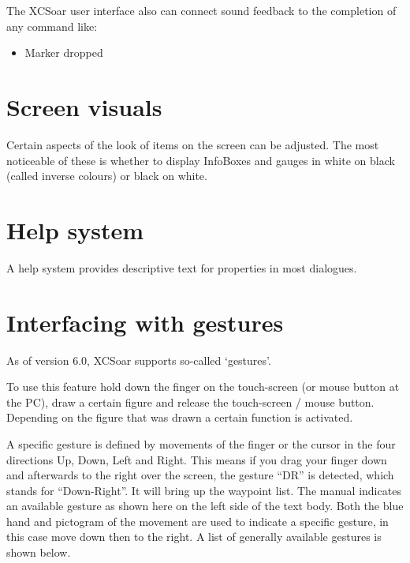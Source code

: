 The XCSoar user interface also can connect sound feedback to the completion 
of any command like:
\begin{itemize}
\item Marker dropped
\end{itemize}


\section{Screen visuals}

Certain aspects of the look of items on the screen can be adjusted.
The most noticeable of these is whether to display InfoBoxes and
gauges in white on black (called inverse colours) or black on white.


\section{Help system}

A help system provides descriptive text for properties in most
dialogues.

\section{Interfacing with gestures}\label{sec:gestures}
As of version 6.0, XCSoar supports so-called `gestures'.

To use this feature hold down the finger on the 
touch-screen (or mouse button at the PC), draw a certain figure and release 
the touch-screen / mouse button. Depending on the figure that was drawn 
a certain function is activated. 

A specific gesture is defined by movements of the finger or the 
cursor in the four directions Up, Down, Left and Right. This means if 
you drag your finger down and afterwards to the right over the screen, 
 the gesture ``DR'' is detected, which stands for ``Down-Right''.
It will bring up the waypoint list. The manual indicates an available 
gesture as shown here on the left side of the text body. Both the blue hand 
and pictogram of the movement are used to indicate a specific gesture, in this 
case move down then to the right. A list of generally available gestures is 
shown below. 
\vspace{2em}

